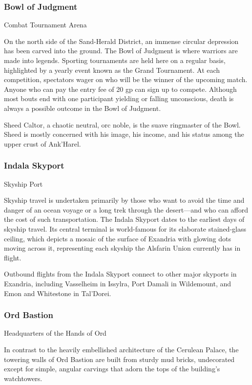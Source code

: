 \documentclass[10pt,a4paper,twoside,bg=print,twocolumn,openany,nodeprecatedcode]{dndbook}
\begin{document}
\subsubsection{Bowl of Judgment}
Combat Tournament Arena

On the north side of the Sand-Herald District, an immense circular depression has been carved into the ground. The Bowl of Judgment is where warriors are made into legends. Sporting tournaments are held here on a regular basis, highlighted by a yearly event known as the Grand Tournament. At each competition, spectators wager on who will be the winner of the upcoming match. Anyone who can pay the entry fee of 20 gp can sign up to compete. Although most bouts end with one participant yielding or falling unconscious, death is always a possible outcome in the Bowl of Judgment.

Sheed Caltor, a chaotic neutral, orc noble, is the suave ringmaster of the Bowl. Sheed is mostly concerned with his image, his income, and his status among the upper crust of Ank'Harel.

\subsubsection{Indala Skyport}
Skyship Port

Skyship travel is undertaken primarily by those who want to avoid the time and danger of an ocean voyage or a long trek through the desert—and who can afford the cost of such transportation. The Indala Skyport dates to the earliest days of skyship travel. Its central terminal is world-famous for its elaborate stained-glass ceiling, which depicts a mosaic of the surface of Exandria with glowing dots moving across it, representing each skyship the Alsfarin Union currently has in flight.

Outbound flights from the Indala Skyport connect to other major skyports in Exandria, including Vasselheim in Issylra, Port Damali in Wildemount, and Emon and Whitestone in Tal'Dorei.

\subsubsection{Ord Bastion}
Headquarters of the Hands of Ord

In contrast to the heavily embellished architecture of the Cerulean Palace, the towering walls of Ord Bastion are built from sturdy mud bricks, undecorated except for simple, angular carvings that adorn the tops of the building's watchtowers.
\end{document}
